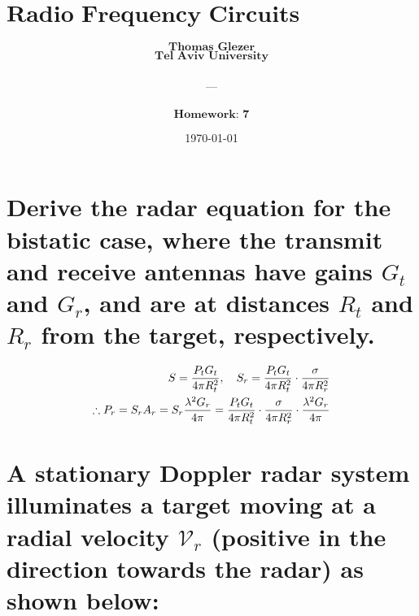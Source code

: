 \documentclass[12pt, letterpaper]{article}
\title{
  \Large $\textbf{Radio Frequency Circuits \& Antenna}$
}
\author{
  $\textbf{Thomas Glezer}$\\
  $\textbf{Tel Aviv University}$\\\\
  ---\\\\
  $\textbf{Homework: 7}$\\
}
\date{\today}
\begin{document}
\begin{titlingpage}
  \maketitle
\end{titlingpage}

\section{Derive the radar equation for the bistatic case, where the transmit and receive
antennas have gains $G_t$ and $G_r$, and are at distances $R_t$ and $R_r$ from the target, respectively.}

\begin{align*}
  S=
  {P_tG_t\over4\pi R_t^2},
  \quad
  S_r=
  {P_tG_t\over4\pi R_t^2}
  \cdot
  {\sigma\over4\pi R_r^2}
  \\
  \therefore
  P_r=
  S_rA_r=
  S_r{\lambda^2G_r\over4\pi}=
  {P_tG_t\over4\pi R_t^2}
  \cdot
  {\sigma\over4\pi R_r^2}
  \cdot
  {\lambda^2G_r\over4\pi}
\end{align*}

\section{A stationary Doppler radar system illuminates a target moving at a radial velocity $\mathcal{V}_r$ (positive in the direction towards the radar) as shown below:}
\end{document}
